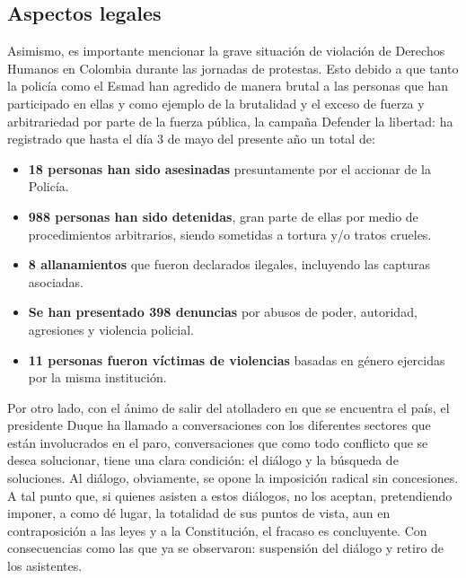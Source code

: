 \documentclass[doc, 12pt, letterpaper, donotrepeattitle, floatsintext, apacite]{apa6}    %
\begin{document}
\subsection{Aspectos legales}
Asimismo, es importante mencionar la grave situación de violación de Derechos Humanos en Colombia durante las jornadas de protestas. Esto debido a que tanto la policía como el Esmad han agredido de manera brutal a las personas que han participado en ellas y como ejemplo de la brutalidad y el exceso de fuerza y arbitrariedad por parte de la fuerza pública, la campaña Defender la libertad: ha registrado que hasta el día 3 de mayo del presente año un total de:
\begin{itemize}
    \item \textbf{18 personas han sido asesinadas} presuntamente por el accionar de la Policía.
    \item \textbf{988 personas han sido detenidas}, gran parte de ellas por medio de procedimientos arbitrarios, siendo sometidas a tortura y/o tratos crueles.
    \item \textbf{8 allanamientos} que fueron declarados ilegales, incluyendo las capturas asociadas.
    \item \textbf{Se han presentado 398 denuncias} por abusos de poder, autoridad, agresiones y violencia policial.
    \item \textbf{11 personas fueron víctimas de violencias} basadas en género ejercidas por la misma institución.
\end{itemize}


Por otro lado, con el ánimo de salir del atolladero en que se encuentra el país, el presidente Duque ha llamado a conversaciones con los diferentes sectores que están involucrados en el paro, conversaciones que como todo conflicto que se desea solucionar, tiene una clara condición: el diálogo y la búsqueda de soluciones. Al diálogo, obviamente, se opone la imposición radical sin concesiones. A tal punto que, si quienes asisten a estos diálogos, no los aceptan, pretendiendo imponer, a como dé lugar, la totalidad de sus puntos de vista, aun en contraposición a las leyes y a la Constitución, el fracaso es concluyente. Con consecuencias como las que ya se observaron: suspensión del diálogo y retiro de los asistentes.
\end{document}
